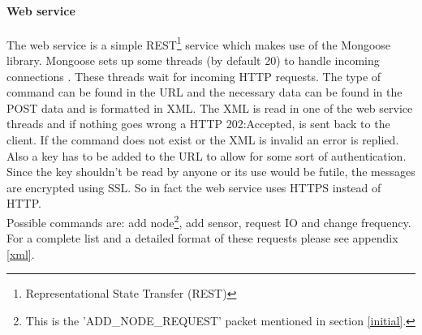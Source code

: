 \paragraph{Web service}
The web service is a simple REST\footnote{Representational State Transfer (REST)} service which makes use of the Mongoose library. Mongoose sets up some threads (by default 20) to handle incoming connections . These threads wait for incoming HTTP requests. The type of command can be found in the URL and the necessary data can be found in the POST data and is formatted in XML. The XML is read in one of the web service threads and if nothing goes wrong a HTTP 202:Accepted, is sent back to the client. If the command does not exist or the XML is invalid an error is replied. Also a key has to be added to the URL to allow for some sort of authentication. Since the key shouldn't be read by anyone or its use would be futile, the messages are encrypted using SSL. So in fact the web service uses HTTPS instead of HTTP.\\
Possible commands are: add node\footnote{This is the 'ADD\_NODE\_REQUEST' packet mentioned in section \ref{initial}.}, add sensor, request IO and change frequency. For a complete list and a detailed format of these requests please see appendix \ref{xml}.

